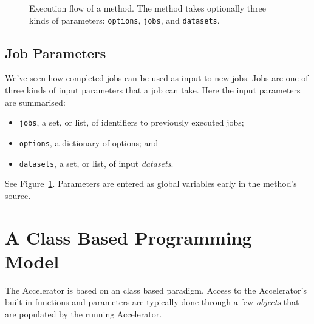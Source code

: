 \begin{figure}[b]
  \begin{center}
    
    \caption{Execution flow of a method.  The method takes optionally
      three kinds of parameters: \texttt{options}, \texttt{jobs},
      and \texttt{datasets}.}
    \label{fig:execflow}
  \end{center}
\end{figure}


\clearpage
\subsection{Job Parameters}
\label{sec:jobparams}
We've seen how completed jobs can be used as input to new
jobs.  Jobs are one of three kinds of input parameters that
a job can take.  Here the input parameters are summarised:
\begin{itemize}
\item[] \texttt{jobs}, a set, or list, of identifiers to previously executed jobs;
\item[] \texttt{options}, a dictionary of options; and
\item[] \texttt{datasets}, a set, or list, of input \textsl{datasets}.
\end{itemize}
See Figure~\ref{fig:execflow}.  Parameters are entered as global
variables early in the method's source.


\section{A Class Based Programming Model}
The Accelerator is based on an class based paradigm. Access to the
Accelerator's built in functions and parameters are typically done
through a few \textsl{objects} that are populated by the running
Accelerator.
